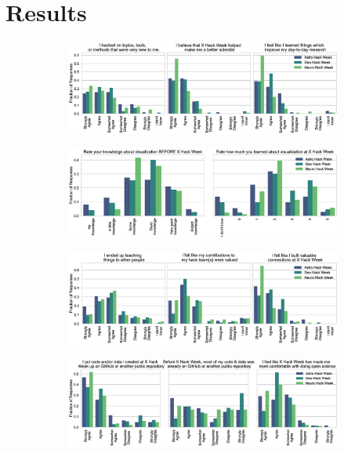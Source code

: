 \section*{Results}

\begin{figure}[h!]
\begin{subfigure}[t]{\textwidth}
\centering
\caption{}
\includegraphics[width=11cm]{fig/eval_techskills.eps}
\end{subfigure}

\begin{subfigure}[t]{\textwidth}
\centering
\caption{}
\includegraphics[width=11cm]{fig/longitudinal_visualization.eps}
\end{subfigure}

\begin{subfigure}[t]{\textwidth}
\centering
\caption{}
\includegraphics[width=11cm]{fig/eval_collab.eps}
\end{subfigure}

\begin{subfigure}[t]{\textwidth}
\centering
\caption{}
\includegraphics[width=11cm]{fig/eval_openscience.eps}
\end{subfigure}


\end{figure}
